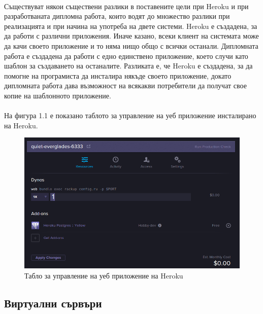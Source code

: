 \documentclass[pdftex,14pt,a4paper]{extreport}
\begin{document}
\paragraph {}

Съществуват някои съществени разлики в поставените цели при Heroku и при разработваната дипломна работа, които водят до множество разлики при реализацията и при начина на употреба на двете системи. Heroku е създадена, за да работи с различни приложения. Иначе казано, всеки клиент на системата може да качи своето приложение и то няма нищо общо с всички останали. Дипломната работа е създадена да работи с едно единствено приложение, което случи като шаблон за създаването на останалите. Разликата е, че Heroku е създадена, за да помогне на програмиста да инсталира някъде своето приложение, докато дипломната работа дава възможност на всякакви потребители да получат свое копие на шаблонното приложение.
\paragraph {}

На фигура 1.1 е показано таблото за управление на уеб приложение инсталирано на Heroku.
\begin{figure}[h]
  \centering
  \includegraphics [scale=0.5]{./heroku_dashboard}
  \caption {Табло за управление на уеб приложение на Heroku}
\end{figure}
\subsection {Виртуални сървъри}
\end{document}
